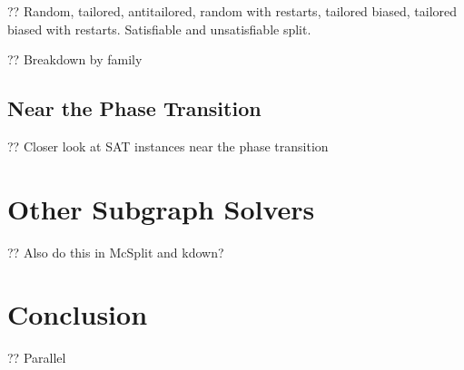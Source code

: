 \documentclass{article}
\begin{document}
?? Random, tailored, antitailored, random with restarts, tailored biased, tailored biased with
restarts. Satisfiable and unsatisfiable split.

?? Breakdown by family

\subsection{Near the Phase Transition}

?? Closer look at SAT instances near the phase transition

\section{Other Subgraph Solvers}

?? Also do this in McSplit and kdown?

\section{Conclusion}

?? Parallel



\end{document}
